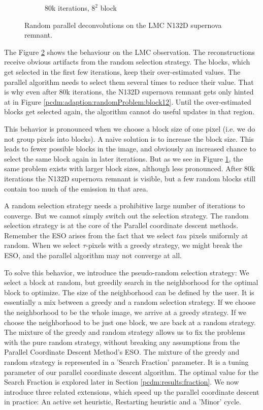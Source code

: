 \begin{figure}[h]
\begin{subfigure}[b]{0.2405\linewidth}
		\caption{80k iterations, $8^2$ block}
		\label{pcdm:adaption:randomProblem:block82}
	\end{subfigure}
	\caption{Random parallel deconvolutions on the LMC N132D supernova remnant.}
	\label{pcdm:adaption:randomProblem}
\end{figure}

The Figure \ref{pcdm:adaption:randomProblem} shows the behaviour on the LMC observation. The reconstructions receive obvious artifacts from the random selection strategy. The blocks, which get selected in the first few iterations, keep their over-estimated values. The parallel algorithm needs to select them several times to reduce their value. That is why even after 80k iterations, the N132D supernova remnant gets only hinted at in Figure \ref{pcdm:adaption:randomProblem:block12}. Until the over-estimated blocks get selected again, the algorithm cannot do useful updates in that region.

This behavior is pronounced when we choose a block size of one pixel (i.e. we do not group pixels into blocks). A naive solution is to increase the block size. This leads to fewer possible blocks in the image, and obviously an increased chance to select the same block again in later iterations. But as we see in Figure \ref{pcdm:adaption:randomProblem:block82}, the same problem exists with larger block sizes, although less pronounced. After 80k iterations the N132D supernova remnant is visible, but a few random blocks still contain too much of the emission in that area.

A random selection strategy needs a prohibitive large number of iterations to converge. But we cannot simply switch out the selection strategy. The random selection strategy is at the core of the Parallel coordinate descent methods. Remember the ESO arises from the fact that we select $tau$ pixels uniformly at random. When we select $\tau$-pixels with a greedy strategy, we might break the ESO, and the parallel algorithm may not converge at all.

To solve this behavior, we introduce the pseudo-random selection strategy:  We select a block at random, but greedily search in the neighborhood for the optimal block to optimize. The size of the neighborhood can be defined by the user. It is essentially a mix between a greedy and a random selection strategy. If we choose the neighborhood to be the whole image, we arrive at a greedy strategy. If we choose the neighborhood to be just one block, we are back at a random strategy. The mixture of the greedy and random strategy allows us to fix the problems with the pure random strategy, without breaking any assumptions from the Parallel Coordinate Descent Method's ESO. The mixture of the greedy and random strategy is represented in a 'Search Fraction' parameter. It is a tuning parameter of our parallel coordinate descent algorithm. The optimal value for the Search Fraction is explored later in Section \ref{pcdm:results:fraction}. We now introduce three related extensions, which speed up the  parallel coordinate descent in practice: An active set heuristic, Restarting heuristic and a 'Minor' cycle.


